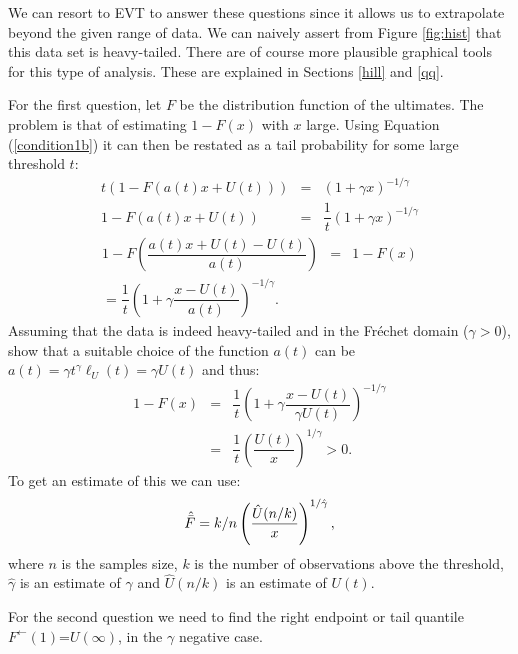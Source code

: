 We can resort to EVT to answer these questions since it allows us to extrapolate beyond the given range of data. We can naively assert from Figure \ref{fig:hist} that this data set is heavy-tailed. There are of course more plausible graphical tools for this type of analysis. These are explained in Sections \ref{hill} and \ref{qq}.

For the first question, let $F$ be the distribution function of the ultimates. The problem is that of estimating $1-F(x)$ with $x$ large. Using Equation (\ref{condition1b}) it can then be restated as a tail probability for some large threshold $t$:
\begin{eqnarray*}
t(1-F(a(t)x + U(t))) &=& (1+\gamma x)^{-1/\gamma}\\
1-F(a(t)x + U(t)) &=& \dfrac{1}{t}\left(1+\gamma x\right)^{-1/\gamma}
\end{eqnarray*}
\begin{eqnarray*}
1-F\left(\dfrac{a(t)x + U(t) - U(t)}{a(t)}\right) &=& 1-F(x)\\
=\dfrac{1}{t}\left(1+\gamma \dfrac{x-U(t)}{a(t)}\right)^{-1/\gamma}.
\end{eqnarray*}Assuming that the data is indeed heavy-tailed and in the Fréchet domain ($\gamma>0$), \cite{sts626} show that a suitable choice of the function $a(t)$ can be $a(t)=\gamma t^{\gamma}\ell_U(t)= \gamma U(t)$ and thus:
\begin{eqnarray*}
1-F(x) &=& \dfrac{1}{t}\left(1+\gamma \dfrac{x-U(t)}{\gamma U(t)}\right)^{-1/\gamma}\\
&=& \dfrac{1}{t}\left(\dfrac{U(t)}{x}\right)^{1/\gamma} > 0.
\end{eqnarray*}
To get an estimate of this we can use:
\begin{eqnarray}
\hat{\bar{F}} = k/n \left( \hat{U}(n/k) \over x \right)^{1/\hat{\gamma}},
\end{eqnarray}where $n$ is the samples size, $k$ is the number of observations above the threshold, $\hat{\gamma}$ is an estimate of $\gamma$ and $\hat{U}(n/k)$ is an estimate of $U(t)$.

For the second question we need to find the right endpoint or tail quantile $F^{\leftarrow}(1)$=$U(\infty)$, in the $\gamma$ negative case.

